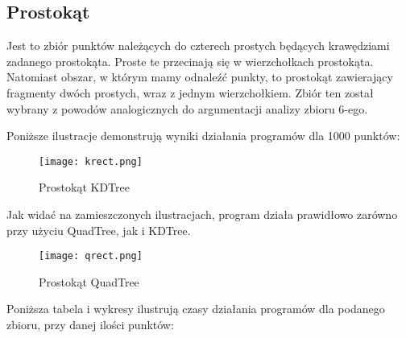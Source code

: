 \documentclass[a4paper, 12pt]{article}
\begin{document}
    \subsection{Prostokąt}
      \quad Jest to zbiór punktów należących do czterech prostych będących krawędziami zadanego prostokąta. Proste te przecinają się w wierzchołkach prostokąta. Natomiast obszar, w którym mamy odnaleźć punkty, to prostokąt zawierający fragmenty dwóch prostych, wraz z jednym wierzchołkiem.  Zbiór ten został wybrany z powodów analogicznych do argumentacji analizy zbioru 6-ego. 

      \noindent
      \quad Poniższe ilustracje demonstrują wyniki działania programów dla 1000 punktów:

      \begin{figure}[h!]
      \centering
        \texttt{[image: krect.png]}
        \caption{Prostokąt KDTree}
      \end{figure}

      \noindent
      \quad Jak widać na zamieszczonych ilustracjach, program działa prawidłowo zarówno przy użyciu QuadTree, jak i KDTree.

      \newpage
      \begin{figure}[h!]
      \centering
        \texttt{[image: qrect.png]}
        \caption{Prostokąt QuadTree}
      \end{figure}

      \noindent
      \quad Poniższa tabela i wykresy ilustrują czasy działania programów dla podanego zbioru, przy danej ilości punktów:
\end{document}
